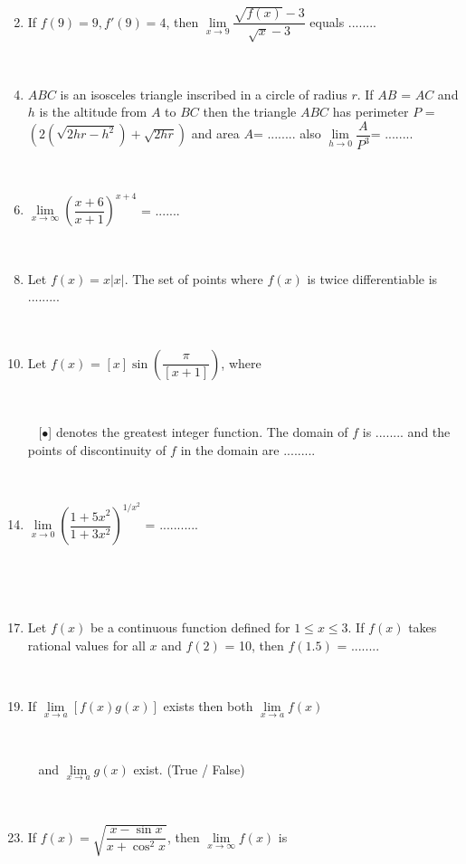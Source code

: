 \begin{enumerate}[label=\arabic*.,ref=\thesubsection.\theenumi]
\item[~]\item If $f(9)=9, f'(9)=4$, then $\lim\limits_{x \to 9} \dfrac{\sqrt{f(x)}-3}{\sqrt{x}-3}$ equals ........

\item[~]\item $ABC$ is an isosceles triangle inscribed in a circle of radius $r$. If $AB$ = $AC$ and $h$ is the altitude from $A$ to $BC$ then the triangle $ABC$ has perimeter $P$ = $\left(2\left(\sqrt{2hr-h^2}\right)+\sqrt{2hr}\right)$ and area $A$= ........ also $\lim\limits_{h \to 0}\dfrac{A}{P^3}$= ........

\item[~]\item $\lim\limits_{x \to \infty}\left(\dfrac{x+6}{x+1}\right)^{x+4}$ = .......

\item[~] \item Let $f(x)=x|x|$. The set of points where $f(x)$ is twice differentiable is .........

\item[~] \item Let $f(x)$ = $\left[x\right]\sin\left(\dfrac{\pi}{\left[x+1\right]}\right)$, where \item[~]\item[~][$\bullet$] denotes the greatest integer function. The domain of $f$ is ........ and the points of discontinuity of $f$ in the domain are .........

\item[~] \item$\lim\limits_{x \to 0}\left(\dfrac{1+5x^2}{1+3x^2}\right)^{1/x^2}$ = ...........

\item[~] \item[~]\item Let $f(x)$ be a continuous function defined for $1\leq x\leq 3$. If $f(x)$ takes rational values for all $x$ and $f(2)$ = 10, then $f(1.5)$ = ........ 

\item[~] \item If $\lim\limits_{x \to a}\left[f(x)g(x)\right]$ exists then both $\lim\limits_{x \to a}f(x)$ \item[~] \item[~]and $\lim\limits_{x \to a}g(x)$ exist. (True / False)

\item[~] \item If $f(x)=\sqrt{\dfrac{x-\sin x}{x+\cos^2x}}$, then $\lim\limits_{x \to \infty}f(x)$ is
\begin{itemize}
\end{itemize}


\end{enumerate}
